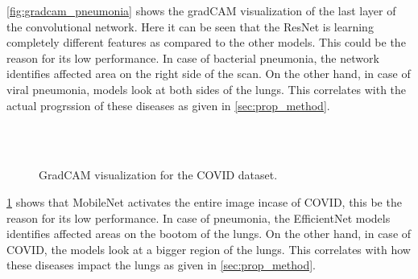 \documentclass[10pt,twocolumn,letterpaper]{article}
\begin{document}
\cref{fig:gradcam_pneumonia} shows the gradCAM visualization of the last layer of the convolutional network.
Here it can be seen that the ResNet is learning completely different features as compared to the other 
models. This could be the reason for its low performance. In case of bacterial pneumonia, the network identifies 
affected area on the right side of the scan. On the other hand, in case of viral pneumonia, models look at both 
sides of the lungs. This correlates with the actual progrssion of these diseases as given in \cref{sec:prop_method}.



\begin{figure}
  \\
  \\
  \caption{GradCAM visualization for the COVID dataset.}
  \label{fig:gradcam_covid}
\end{figure}

\cref{fig:gradcam_covid} shows that MobileNet activates the entire image incase of COVID, this be the 
reason for its low performance. In case of pneumonia, the EfficientNet models identifies 
affected areas on the bootom of the lungs. On the other hand, in case of COVID, the models look at a bigger 
region of the lungs. This correlates with how these diseases impact the lungs as given in \cref{sec:prop_method}.
\end{document}
